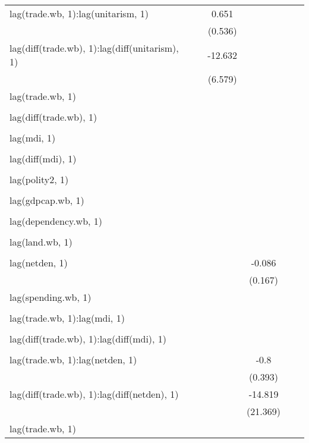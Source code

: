 \begin{table}[htbp]
\begin{tabular}{l*{5}{c}}
lag(trade.wb, 1):lag(unitarism, 1) 		& 		&0.651 		& 		& 		& \\
  		& 		&(0.536) 		& 		& 		& \\
lag(diff(trade.wb), 1):lag(diff(unitarism), 1) 		& 		&-12.632\sym{*} 		& 		& 		& \\
  		& 		&(6.579) 		& 		& 		& \\
lag(trade.wb, 1) 		& 		& 		& 		& 		& \\
  		& 		& 		& 		& 		& \\
lag(diff(trade.wb), 1) 		& 		& 		& 		& 		& \\
  		& 		& 		& 		& 		& \\
lag(mdi, 1) 		& 		& 		& 		& 		& \\
  		& 		& 		& 		& 		& \\
lag(diff(mdi), 1) 		& 		& 		& 		& 		& \\
  		& 		& 		& 		& 		& \\
lag(polity2, 1) 		& 		& 		& 		& 		& \\
  		& 		& 		& 		& 		& \\
lag(gdpcap.wb, 1) 		& 		& 		& 		& 		& \\
  		& 		& 		& 		& 		& \\
lag(dependency.wb, 1) 		& 		& 		& 		& 		& \\
  		& 		& 		& 		& 		& \\
lag(land.wb, 1) 		& 		& 		& 		& 		& \\
  		& 		& 		& 		& 		& \\
lag(netden, 1) 		& 		& 		&-0.086 		& 		& \\
  		& 		& 		&(0.167) 		& 		& \\
lag(spending.wb, 1) 		& 		& 		& 		& 		& \\
  		& 		& 		& 		& 		& \\
lag(trade.wb, 1):lag(mdi, 1) 		& 		& 		& 		& 		& \\
  		& 		& 		& 		& 		& \\
lag(diff(trade.wb), 1):lag(diff(mdi), 1) 		& 		& 		& 		& 		& \\
  		& 		& 		& 		& 		& \\
lag(trade.wb, 1):lag(netden, 1) 		& 		& 		&-0.8\sym{**} 		& 		& \\
  		& 		& 		&(0.393) 		& 		& \\
lag(diff(trade.wb), 1):lag(diff(netden), 1) 		& 		& 		&-14.819 		& 		& \\
  		& 		& 		&(21.369) 		& 		& \\
lag(trade.wb, 1) 		& 		& 		& 		& 		& \\

\end{tabular}
\end{table}
